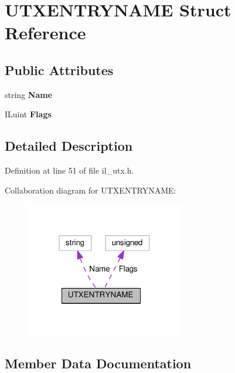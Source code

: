 \hypertarget{structUTXENTRYNAME}{}\section{U\+T\+X\+E\+N\+T\+R\+Y\+N\+A\+ME Struct Reference}
\label{structUTXENTRYNAME}
\subsection*{Public Attributes}
\begin{DoxyCompactItemize}
\item 
\mbox{\label{structUTXENTRYNAME_a18c6a264905177a9ac0b741770115791}} 
string {\bfseries Name}
\item 
\mbox{\label{structUTXENTRYNAME_adadc5dffc311a57a9b8086e405905264}} 
I\+Luint {\bfseries Flags}
\end{DoxyCompactItemize}


\subsection{Detailed Description}


Definition at line 51 of file il\+\_\+utx.\+h.



Collaboration diagram for U\+T\+X\+E\+N\+T\+R\+Y\+N\+A\+ME\+:
\nopagebreak
\begin{figure}[H]
\begin{center}
\leavevmode
\includegraphics[width=196pt]{d9/df1/structUTXENTRYNAME__coll__graph}
\end{center}
\end{figure}


\subsection{Member Data Documentation}
\mbox{\label{structUTXENTRYNAME_adadc5dffc311a57a9b8086e405905264}} 
